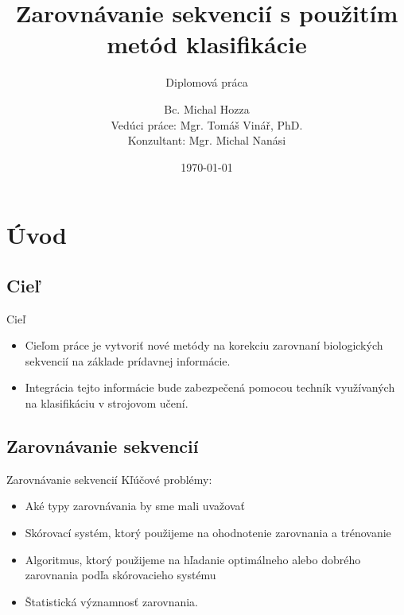 \documentclass[xcolor=dvipsnames, compress, 12pt]{beamer}
\title{Zarovnávanie sekvencií s použitím metód klasifikácie}
\subtitle{
\vspace{0.5cm}
\small Diplomová práca
}
\author[Michal Hozza]{\small Bc. Michal Hozza \\ Vedúci práce: Mgr. Tomáš Vinář, PhD. \\ Konzultant: Mgr. Michal Nanási}
\institute[FMFI UK]{
  Fakulta matematiky, fyziky a informatiky,
  Univerzita Komenského, Bratislava\\
}
\date{\today}
\begin{document}
\begin{frame}[plain]
  \titlepage
\end{frame}



\section{Úvod}
\subsection{Cieľ}
\begin{frame}{Cieľ}
  \begin{itemize}
  \item Cieľom práce je vytvoriť nové metódy na korekciu zarovnaní biologických sekvencií na základe prídavnej informácie.
  \item Integrácia tejto informácie bude zabezpečená pomocou techník využívaných na klasifikáciu v strojovom učení.
  \end{itemize} 
\end{frame}


\subsection{Zarovnávanie sekvencií}
\begin{frame}{Zarovnávanie sekvencií}
Kľúčové problémy:
  \begin{itemize}
    \item Aké typy zarovnávania by sme mali uvažovať
    \item Skórovací systém, ktorý použijeme na ohodnotenie zarovnania a trénovanie
    \item Algoritmus, ktorý použijeme na hľadanie optimálneho alebo dobrého zarovnania podľa skórovacieho systému
    \item Štatistická významnosť zarovnania.
  \end{itemize} 
\end{frame}
\end{document}
